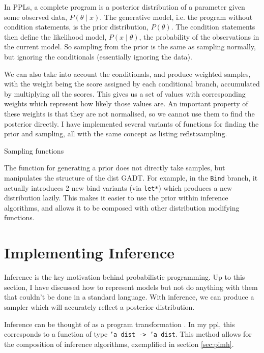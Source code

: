 In PPLs, a complete program is a posterior distribution of a parameter given some observed data, $P(\theta\mid x)$. The generative model, i.e. the program without condition statements, is the prior distribution, $P(\theta)$. The condition statements then define the likelihood model, $P(x\mid \theta)$, the probability of the observations in the current model. So sampling from the prior is the same as sampling normally, but ignoring the conditionals (essentially ignoring the data).
				
We can also take into account the conditionals, and produce weighted samples, with the weight being the score assigned by each conditional branch, accumulated by multiplying all the scores. This gives us a set of values with corresponding weights which represent how likely those values are. An important property of these weights is that they are not normalised, so we cannot use them to find the posterior directly. I have implemented several variants of functions for finding the prior and sampling, all with the same concept as listing ref{lst:sampling}.
				
\begin{listing}[!htb]
	\centering
	\caption{Sampling functions}
	\label{lst:sampling}
\end{listing}
				
The function for generating a prior does not directly take samples, but manipulates the structure of the dist GADT. For example, in the \texttt{Bind} branch, it actually introduces 2 new bind variants (via \texttt{let*}) which produces a new distribution lazily. This makes it easier to use the prior within inference algorithms, and allows it to be composed with other distribution modifying functions.
				
\section{Implementing Inference} \label{sec:inference}
			
Inference is the key motivation behind probabilistic programming. Up to this section, I have discussed how to represent models but not do anything with them that couldn't be done in a standard language. With inference, we can produce a sampler which will accurately reflect a posterior distribution.
				
Inference can be thought of as a program transformation \cite{scibior2015practical, Zinkov2016ComposingIA}. In my ppl, this corresponds to a function of type \texttt{'a dist -> 'a dist}. This method allows for the composition of inference algorithms, exemplified in section \ref{sec:pimh}.
				
